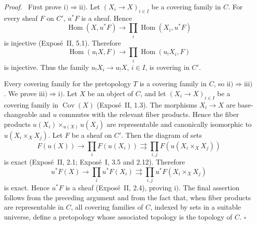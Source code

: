 \documentclass[11pt]{article}
\newcommand{\Hom}{\operatorname{Hom}}
\newcommand{\Cov}{\operatorname{Cov}}
\newcommand{\qedtext}{\hfill\(\square\)}
\newenvironment{prooftext}{\par\noindent\emph{Proof.}\ }{\par\medskip}
\begin{document}
\begin{prooftext}
First prove \(\mathrm{i})\Rightarrow\mathrm{ii})\). Let \((X_i\to X)_{i\in I}\) be a covering family in \(C\). For every sheaf \(F\) on \(C'\), \(u^*F\) is a sheaf. Hence
\[
\Hom(X,u^*F)\longrightarrow\prod_i\Hom(X_i,u^*F)
\]
is injective (Expos\'e~II, 5.1). Therefore
\[
\Hom(u_!X,F)\longrightarrow\prod_i\Hom(u_!X_i,F)
\]
is injective. Thus the family \(u_!X_i\to u_!X\), \(i\in I\), is covering in \(C'\).

Every covering family for the pretopology \(T\) is a covering family in \(C\), so \(\mathrm{ii})\Rightarrow\mathrm{iii})\). We prove \(\mathrm{iii})\Rightarrow\mathrm{i})\). Let \(X\) be an object of \(C\), and let \((X_i\to X)_{i\in I}\) be a covering family in \(\Cov(X)\) (Expos\'e~II, 1.3). The morphisms \(X_i\to X\) are base-changeable and \(u\) commutes with the relevant fiber products. Hence the fiber products \(u(X_i)\times_{u(X)}u(X_j)\) are representable and canonically isomorphic to \(u(X_i\times_XX_j)\). Let \(F\) be a sheaf on \(C'\). Then the diagram of sets
\[
F(u(X))\longrightarrow\prod_iF(u(X_i))\rightrightarrows\prod_{i,j}F(u(X_i\times_XX_j))
\]
is exact (Expos\'e~II, 2.1; Expos\'e~I, 3.5 and 2.12). Therefore
\[
u^*F(X)\longrightarrow\prod_i u^*F(X_i)\rightrightarrows\prod_{i,j}u^*F(X_i\times_XX_j)
\]
is exact. Hence \(u^*F\) is a sheaf (Expos\'e~II, 2.4), proving \(\mathrm{i})\). The final assertion follows from the preceding argument and from the fact that, when fiber products are representable in \(C\), all covering families of \(C\), indexed by sets in a suitable universe, define a pretopology whose associated topology is the topology of \(C\). \qedtext
\end{prooftext}
\end{document}

